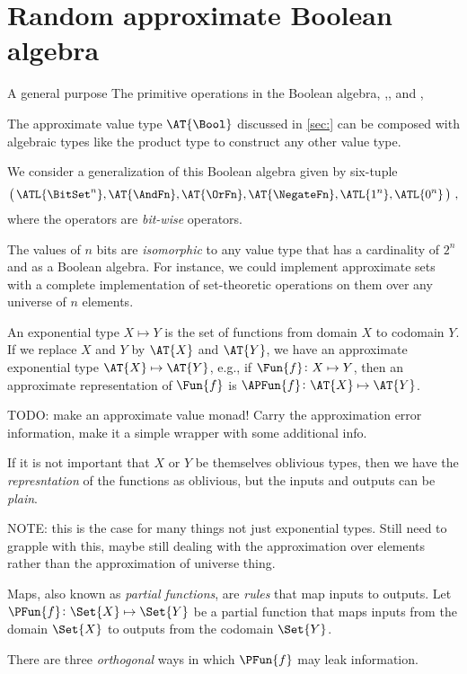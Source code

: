 \documentclass[ ../main.tex]{subfiles}
\begin{document}
\section{Random approximate Boolean algebra}
A general purpose The primitive operations in the Boolean algebra, \AndFn,\OrFn, and \NegateFn, 

The approximate value type $\AT{\Bool}$ discussed in \cref{sec:} can be composed with algebraic types like the product type to construct any other value type.

We consider a generalization of this Boolean algebra given by six-tuple
\begin{equation}
	\left(\,\ATL{\BitSet^n},\AT{\AndFn},\AT{\OrFn},\AT{\NegateFn},\ATL{1^n},\ATL{0^n}\,\right)\,,
\end{equation}
where the operators are \emph{bit-wise} operators.

The values of $n$ bits are \emph{isomorphic} to any value type that has a cardinality of $2^n$ and as a Boolean algebra.
For instance, we could implement approximate sets with a complete implementation of set-theoretic operations on them over any universe of $n$ elements.
	
An exponential type $X \mapsto Y$ is the set of functions from domain $X$ to codomain $Y$. If we replace $X$ and $Y$ by $\AT{X}$ and $\AT{Y}$, we have an approximate exponential type $\AT{X} \mapsto \AT{Y}$, e.g., if $\Fun{f} \colon X \mapsto Y$, then an approximate representation of $\Fun{f}$ is $\APFun{f} \colon \AT{X} \mapsto \AT{Y}$.

TODO: make an approximate value monad! Carry the approximation error information, make it a simple wrapper with some additional info.
	
If it is not important that $X$ or $Y$ be themselves oblivious types, then we have the \emph{represntation} of the functions as oblivious, but the inputs and outputs can be \emph{plain}.
	
NOTE: this is the case for many things not just exponential types. Still need to grapple with this, maybe still dealing with the approximation over elements rather than the approximation of universe thing.
	
	
	
	Maps, also known as \emph{partial functions}, are \emph{rules} that map inputs to outputs.
	Let $\PFun{f} \colon \Set{X} \mapsto \Set{Y}$ be a partial function that maps inputs from the domain $\Set{X}$ to outputs from the codomain $\Set{Y}$.
	
	There are three \emph{orthogonal} ways in which $\PFun{f}$ may leak information.
	
\end{document}
